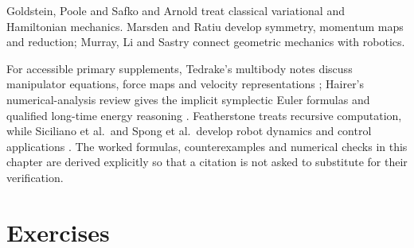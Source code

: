 Goldstein, Poole and Safko \cite{Goldstein2002} and Arnold \cite{Arnold1989} treat classical variational and Hamiltonian mechanics. Marsden and Ratiu \cite{marsden1999} develop symmetry, momentum maps and reduction; Murray, Li and Sastry \cite{Murray1994} connect geometric mechanics with robotics.

For accessible primary supplements, Tedrake's multibody notes discuss manipulator equations, force maps and velocity representations \cite{TedrakeMultibodySupplement}; Hairer's numerical-analysis review gives the implicit symplectic Euler formulas and qualified long-time energy reasoning \cite{HairerChallengesSupplement}. Featherstone \cite{Featherstone2008} treats recursive computation, while Siciliano et al.\ and Spong et al.\ develop robot dynamics and control applications \cite{siciliano2009,Spong2006}. The worked formulas, counterexamples and numerical checks in this chapter are derived explicitly so that a citation is not asked to substitute for their verification.

\section{Exercises}
\label{sec:lagrangian_exercises}

